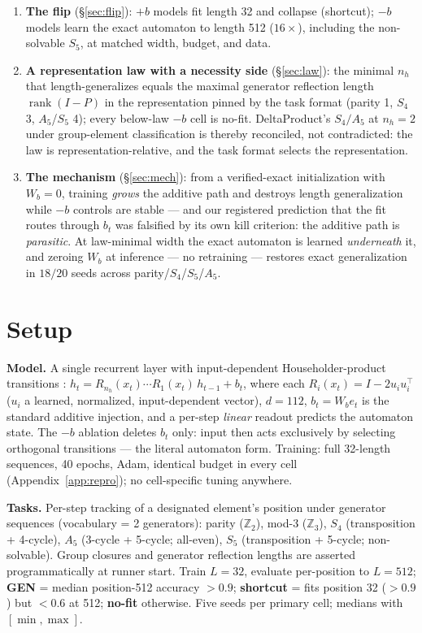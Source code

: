\documentclass[10pt]{article}
\newcommand{\bt}{b_t}
\begin{document}
\begin{enumerate}\itemsep2pt
\item \textbf{The flip} (\S\ref{sec:flip}): $+b$ models fit length 32 and collapse
  (shortcut); $-b$ models learn the exact automaton to length 512 ($16\times$), including the
  non-solvable $S_5$, at matched width, budget, and data.
\item \textbf{A representation law with a necessity side} (\S\ref{sec:law}): the minimal $n_h$ that
  length-generalizes equals the maximal generator reflection length $\operatorname{rank}(I-P)$ in the
  representation pinned by the task format (parity 1, $S_4$ 3, $A_5$/$S_5$ 4); every below-law $-b$
  cell is no-fit. DeltaProduct's $S_4/A_5$ at $n_h{=}2$ under group-element classification
  \citep{siems2025deltaproduct} is thereby reconciled, not contradicted: the law is
  representation-relative, and the task format selects the representation.
\item \textbf{The mechanism} (\S\ref{sec:mech}): from a verified-exact initialization with $W_b{=}0$,
  training \emph{grows} the additive path and destroys length generalization while $-b$ controls are
  stable --- and our registered prediction that the fit routes through $\bt$ was falsified by its own
  kill criterion: the additive path is \emph{parasitic}. At law-minimal width the exact automaton is
  learned \emph{underneath} it, and zeroing $W_b$ at inference --- no retraining --- restores exact
  generalization in $18/20$ seeds across parity/$S_4$/$S_5$/$A_5$.
\end{enumerate}

\section{Setup}\label{sec:setup}
\textbf{Model.} A single recurrent layer with input-dependent Householder-product transitions
\citep{siems2025deltaproduct}: $h_t = R_{n_h}(x_t)\cdots R_1(x_t)\,h_{t-1} + \bt$, where each
$R_i(x_t)=I-2u_i u_i^\top$ ($u_i$ a learned, normalized, input-dependent vector), $d{=}112$,
$\bt=W_b e_t$ is the standard additive injection, and a per-step \emph{linear} readout predicts the
automaton state. The $-b$ ablation deletes $\bt$ only: input then acts exclusively by selecting
orthogonal transitions --- the literal automaton form. Training: full 32-length sequences, 40 epochs,
Adam, identical budget in every cell (Appendix~\ref{app:repro}); no cell-specific tuning anywhere.

\textbf{Tasks.} Per-step tracking of a designated element's position under generator sequences
(vocabulary = 2 generators): parity ($\mathbb{Z}_2$), mod-3 ($\mathbb{Z}_3$), $S_4$
(transposition + 4-cycle), $A_5$ (3-cycle + 5-cycle; all-even), $S_5$ (transposition + 5-cycle;
non-solvable). Group closures and generator reflection lengths are asserted programmatically at
runner start. Train $L{=}32$, evaluate per-position to $L{=}512$; \textbf{GEN} = median position-512
accuracy ${>}0.9$; \textbf{shortcut} = fits position 32 (${>}0.9$) but ${<}0.6$ at 512;
\textbf{no-fit} otherwise. Five seeds per primary cell; medians with $[\min,\max]$.
\end{document}
